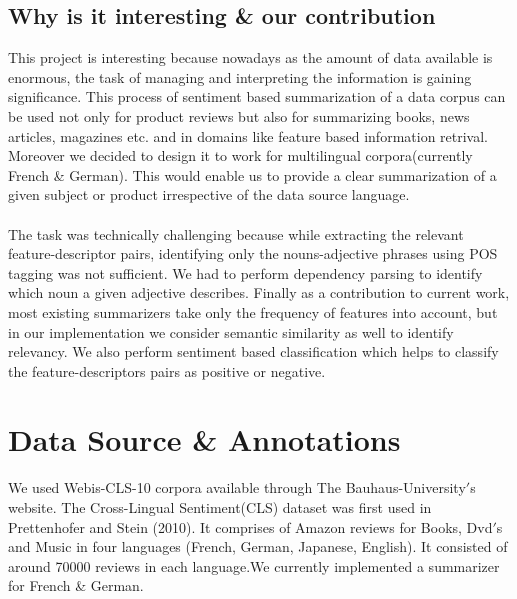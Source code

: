 \documentclass[conference]{IEEEtran}
\begin{document}
\subsection{\textbf{Why is it interesting \& our contribution}}
\indent This project is interesting because nowadays as the amount of data available is enormous, the task of managing and interpreting the information is gaining significance. This process  of sentiment based summarization of a data corpus can be used not only for product reviews but also for summarizing books, news articles, magazines etc. and in domains like feature based information retrival. Moreover we decided to design it to work for multilingual corpora(currently French \& German). This would enable us to provide a clear summarization of a given subject or product irrespective of the data source language.\\\\
\indent The task was technically challenging because while extracting the relevant feature-descriptor pairs, identifying only the nouns-adjective phrases using POS tagging was not sufficient. We had to perform dependency parsing to identify which noun a given adjective describes. Finally as a contribution to current work, most existing summarizers take only the frequency of features into account, but in our implementation we consider semantic similarity as well to identify relevancy. We also perform sentiment based classification which helps to classify the feature-descriptors pairs as positive or negative.

\section{\textbf{Data Source \& Annotations}}
\indent We used Webis-CLS-10 corpora available through The Bauhaus-University$'$s website. The Cross-Lingual Sentiment(CLS) dataset was first used in Prettenhofer and Stein (2010). It comprises of Amazon reviews for Books, Dvd$'$s and Music in four languages (French, German, Japanese, English). It consisted of around 70000 reviews in each language.We currently implemented a summarizer for French \& German.
\end{document}
